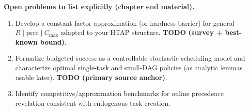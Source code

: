 \textbf{Open problems to list explicitly (chapter end material).}

\begin{enumerate}
\item Develop a constant-factor approximation (or hardness barrier) for general \(R\mid \mathrm{prec}\mid C_{\max}\) adapted to your HTAP structure. \textbf{TODO (survey + best-known bound)}.
\item Formalize budgeted success as a controllable stochastic scheduling model and characterize optimal single-task and small-DAG policies (as analytic lemmas usable later). \textbf{TODO (primary source anchor)}.
\item Identify competitive/approximation benchmarks for online precedence revelation consistent with endogenous task creation.
\end{enumerate}
